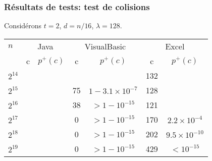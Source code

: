 \documentclass[t,usepdftitle=false]{beamer}
\def\eps {$< 10^{-15}$}
\def\epsm {$> 1-10^{-15}$}
\begin{document}
\begin{frame}
\frametitle{Résultats de tests: test de colisions}

Considérons $t = 2$, $d = n/16$, $\lambda = 128$.
\begin{center}
\begin {tabular}{|l|cc|cc|cc|}
\hline \rule{0pt}{11pt} $n$ & \multicolumn{2}{c|}{Java} &
 \multicolumn{2}{c|}{VisualBasic} & \multicolumn{2}{c|}{Excel} \\
 \rule{0pt}{11pt} & c & $p^+(c)$ & c & $p^+(c)$ & c & $p^+(c)$ \\
 \hline $2^{14}$ & & & & & 132 & \rule{0pt}{11pt}\\ 
 $2^{15}$ & & & 75 & $1-3.1\times 10^{-7}$ & 128 & \\ 
 $2^{16}$ & & & 38 & \epsm & 121 & \\
 $2^{17}$ & & &  0 & \epsm & 170 & $2.2\times 10^{-4}$\\ 
 $2^{18}$ & & &  0 & \epsm & 202 & $9.5\times 10^{-10}$\\ 
 $2^{19}$ & & &  0 & \epsm & 429 & \eps \\
\hline
\end {tabular}
\end{center}

\end{frame}
\end{document}
